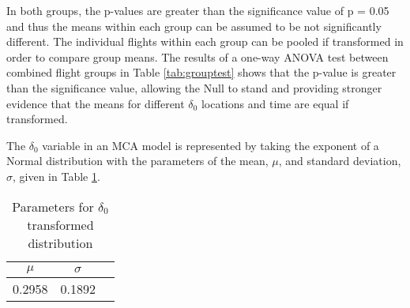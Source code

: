 \documentclass[preprint,12pt,a4paper]{elsarticle}
\begin{document}
\begin{linenumbers}
In both groups, the p-values are greater than the significance value of p = 0.05 and thus the means within each group can be assumed to be not significantly different. The individual flights within each group can be pooled if transformed in order to compare group means. The results of a one-way ANOVA test between combined flight groups in Table \ref{tab:grouptest} shows that the p-value is greater than the significance value, allowing the Null to stand and providing stronger evidence that the means for different $\delta_{0}$ locations and time are equal if transformed.
%
\begin{table}[H]
\centering
\caption{Statistics and one-way ANOVA test for transformed groups.}
\label{tab:grouptest}
\end{table}

The $\delta_{0}$ variable in an MCA model is represented by taking the exponent of a Normal distribution with the parameters of the mean, $\mu$, and standard deviation, $\sigma$, given in Table \ref{tab:gapnormal}.

\begin{table}[H]
\centering
\caption{Parameters for $\delta_{0}$ transformed distribution}
\label{tab:gapnormal}
\begin{tabular}{@{}ccc@{}}
\toprule
 \textbf{$\mu$} & \textbf{$\sigma$} \\ \midrule
 0.2958 & 0.1892 \\ \bottomrule
\end{tabular}
\end{table}


\end{linenumbers}
\end{document}

